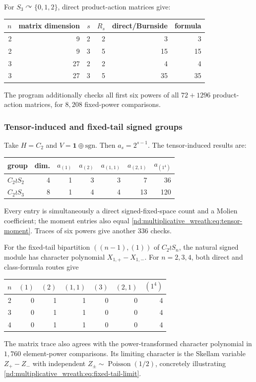 \documentclass[10pt]{article}
\begin{document}
For $S_3\curvearrowright\{0,1,2\}$, direct product-action matrices give:
\begin{center}
\begin{tabular}{rrrrrr}
\toprule
$n$ & matrix dimension & $s$ & $R_s$ & direct/Burnside & formula\\
\midrule
2 & 9  & 2 & 2 & 3  & 3\\
2 & 9  & 3 & 5 & 15 & 15\\
3 & 27 & 2 & 2 & 4  & 4\\
3 & 27 & 3 & 5 & 35 & 35\\
\bottomrule
\end{tabular}
\end{center}
The program additionally checks all first six powers of all $72+1296$
product-action matrices, for $8{,}208$ fixed-power comparisons.

\subsubsection{Tensor-induced and fixed-tail signed groups}

Take $H=C_2$ and $V=\mathbf1\oplus\mathrm{sgn}$.  Then
$a_s=2^{s-1}$.  The tensor-induced results are:
\begin{center}
\begin{tabular}{lrrrrrr}
\toprule
group & dim. & $a_{(1)}$ & $a_{(2)}$ & $a_{(1,1)}$ & $a_{(2,1)}$ & $a_{(1^4)}$\\
\midrule
$C_2\wr S_2$ & 4 & 1 & 3 & 3 & 7  & 36\\
$C_2\wr S_3$ & 8 & 1 & 4 & 4 & 13 & 120\\
\bottomrule
\end{tabular}
\end{center}
Every entry is simultaneously a direct signed-fixed-space count and a Molien
coefficient; the moment entries also equal \eqref{nd:multiplicative_wreath:eq:tensor-moment}.  Traces
of six powers give another $336$ checks.

For the fixed-tail bipartition $((n-1),(1))$ of $C_2\wr S_n$, the natural
signed module has character polynomial $X_{1,+}-X_{1,-}$.  For $n=2,3,4$,
both direct and class-formula routes give
\begin{center}
\begin{tabular}{c|rrrrrr}
\toprule
$n$ & $(1)$ & $(2)$ & $(1,1)$ & $(3)$ & $(2,1)$ & $(1^4)$\\
\midrule
2 & 0&1&1&0&0&4\\
3 & 0&1&1&0&0&4\\
4 & 0&1&1&0&0&4\\
\bottomrule
\end{tabular}
\end{center}
The matrix trace also agrees with the power-transformed character polynomial
in $1{,}760$ element-power comparisons.  Its limiting character is the
Skellam variable $Z_+-Z_-$ with independent
$Z_\pm\sim\operatorname{Poisson}(1/2)$, concretely illustrating
\eqref{nd:multiplicative_wreath:eq:fixed-tail-limit}.
\end{document}
